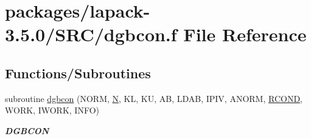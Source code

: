 \hypertarget{dgbcon_8f}{}\section{packages/lapack-\/3.5.0/\+S\+R\+C/dgbcon.f File Reference}
\label{dgbcon_8f}
\subsection*{Functions/\+Subroutines}
\begin{DoxyCompactItemize}
\item 
subroutine \hyperlink{group__doubleGBcomputational_gac5177acc7bb06382c90e88f12ed784ff}{dgbcon} (N\+O\+R\+M, \hyperlink{polmisc_8c_a0240ac851181b84ac374872dc5434ee4}{N}, K\+L, K\+U, A\+B, L\+D\+A\+B, I\+P\+I\+V, A\+N\+O\+R\+M, \hyperlink{superlu__enum__consts_8h_af00a42ecad444bbda75cde1b64bd7e72a9b5c151728d8512307565994c89919d5}{R\+C\+O\+N\+D}, W\+O\+R\+K, I\+W\+O\+R\+K, I\+N\+F\+O)
\begin{DoxyCompactList}\small\item\em {\bfseries D\+G\+B\+C\+O\+N} \end{DoxyCompactList}\end{DoxyCompactItemize}
